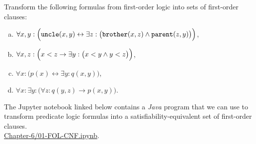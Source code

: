 \exerciseEng
Transform the following formulas from first-order logic into sets of first-order clauses:
\begin{enumerate}[(a)]
\item $\forall x, y: \Bigl(\mathtt{uncle}(x,y) \leftrightarrow
       \exists z: \bigl(\mathtt{brother}(x,z) \wedge \mathtt{parent}(z,y)\bigr)\Bigr)$,
\item $\forall x, z: \Bigl(x < z \rightarrow \exists y: \bigl(x < y \wedge y < z\bigr)\Bigr)$,
\item $\forall x: \bigl(p(x) \leftrightarrow \exists y: q(x,y) \bigr)$, 
\item $\forall x: \exists y: \bigl(\forall z:q(y,z) \rightarrow p(x,y)\bigr)$. \eox
\end{enumerate}%
\vspace*{-0.1cm}

\noindent
The Jupyter notebook linked below contains a \textsl{Java} program that we can use to transform predicate
logic formulas into a satisfiability-equivalent set of first-order clauses. 
\\[0.2cm]
\hspace*{1.3cm}
\href{https://github.com/karlstroetmann/Logic/blob/master/Java/Chapter-6/01-FOL-CNF.ipynb}{Chapter-6/01-FOL-CNF.ipynb}.
\vspace*{0.2cm}

